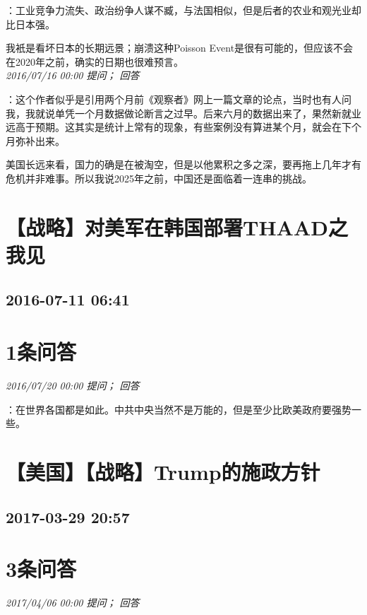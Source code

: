 \documentclass[twocolumn]{ctexart}
\begin{document}
：工业竞争力流失、政治纷争人谋不臧，与法国相似，但是后者的农业和观光业却比日本强。

我衹是看坏日本的长期远景；崩溃这种Poisson Event是很有可能的，但应该不会在2020年之前，确实的日期也很难预言。\\

\textit{\hfill\noindent\small 2016/07/16 00:00 提问； 回答}

：这个作者似乎是引用两个月前《观察者》网上一篇文章的论点，当时也有人问我，我就说单凭一个月数据做论断言之过早。后来六月的数据出来了，果然新就业远高于预期。这其实是统计上常有的现象，有些案例没有算进某个月，就会在下个月弥补出来。

美国长远来看，国力的确是在被淘空，但是以他累积之多之深，要再拖上几年才有危机并非难事。所以我说2025年之前，中国还是面临着一连串的挑战。\\


\section{【战略】对美军在韩国部署THAAD之我见}
\subsection{2016-07-11 06:41}


\section{1条问答}

\textit{\hfill\noindent\small 2016/07/20 00:00 提问； 回答}

：在世界各国都是如此。中共中央当然不是万能的，但是至少比欧美政府要强势一些。\\


\section{【美国】【战略】Trump的施政方针}
\subsection{2017-03-29 20:57}


\section{3条问答}

\textit{\hfill\noindent\small 2017/04/06 00:00 提问； 回答}
\end{document}

